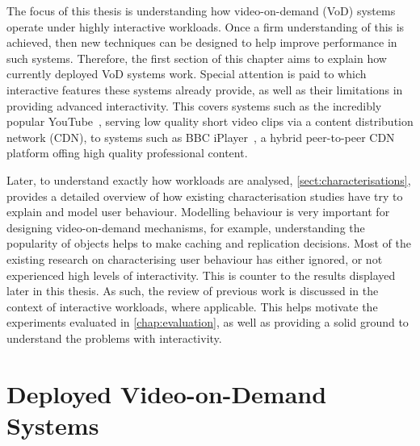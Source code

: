 


The focus of this thesis is understanding how video-on-demand (VoD) systems operate under highly interactive workloads. Once a firm understanding of this is achieved, then new techniques can be designed to help improve performance in such systems. Therefore, the first section of this chapter aims to explain how currently deployed VoD systems work. Special attention is paid to which interactive features these systems already provide, as well as their limitations in providing advanced interactivity. This covers systems such as the incredibly popular YouTube~\cite{youtube}, serving low quality short video clips via a content distribution network (CDN), to systems such as BBC iPlayer~\cite{iplayer}, a hybrid peer-to-peer CDN platform offing high quality professional content.

Later, to understand exactly how workloads are analysed, \autoref{sect:characterisations}, provides a detailed overview of how existing characterisation studies have try to explain and model user behaviour. Modelling behaviour is very important for designing video-on-demand mechanisms, for example, understanding the popularity of objects helps to make caching and replication decisions. Most of the existing research on characterising user behaviour has either ignored, or not experienced high levels of interactivity. This is counter to the results displayed later in this thesis. As such, the review of previous work is discussed in the context of interactive workloads, where applicable. This helps motivate the experiments evaluated in \autoref{chap:evaluation}, as well as providing a solid ground to understand the problems with interactivity.


\section{Deployed Video-on-Demand Systems}
\label{sect:video-on-demand}

